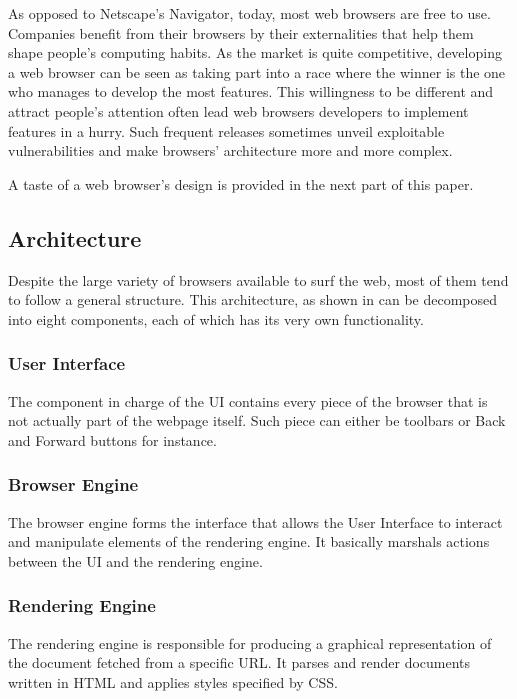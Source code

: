 \documentclass[journal]{IEEEtran}
\begin{document}
As opposed to Netscape's Navigator, today, most web browsers are free to use. Companies benefit from their browsers by their externalities that help them shape people's computing habits.
As the market is quite competitive, developing a web browser can be seen as taking part into a race where the winner is the one who manages to develop the most features. This willingness to be different and attract people's attention often lead web browsers developers to implement features in a hurry. Such frequent releases sometimes unveil exploitable vulnerabilities and make browsers' architecture more and more complex.

\medskip

A taste of a web browser's design is provided in the next part of this paper.

\subsection{Architecture}

Despite the large variety of browsers available to surf the web, most of them tend to follow a general structure. This architecture, as shown in \cite{architectureWebBrowsers} \cite{howBrowsersWork} can be decomposed into eight components, each of which has its very own functionality.

\subsubsection{User Interface}
The component in charge of the UI contains every piece of the browser that is not actually part of the webpage itself. Such piece can either be toolbars or Back and Forward buttons for instance.

\subsubsection{Browser Engine}
The browser engine forms the interface that allows the User Interface to interact and manipulate elements of the rendering engine. It basically marshals actions between the UI and the rendering engine.

\subsubsection{Rendering Engine}
The rendering engine is responsible for producing a graphical representation of the document fetched from a specific URL. It parses and render documents written in HTML and applies styles specified by CSS.
\end{document}
